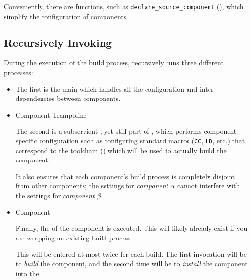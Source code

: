 Conveniently, there are \lmsbw functions, such as
\texttt{declare\_source\_component}
(), which simplify the
configuration of components.

\subsection{Recursively Invoking \make}

During the execution of the build process, \lmsbw recursively runs
three different \makefile processes:

\begin{itemize}
\item \lmsbw \makefile

  The first is the main \lmsbw \makefile which handles all the
  configuration and inter-dependencies between components.

\item Component Trampoline \makefile

  The second is a subservient \makefile, yet still part of \lmsbw,
  which performs component-specific configuration such as configuring
  standard \makefile macros (\texttt{CC}, \texttt{LD}, etc.) that
  correspond to the toolchain () which will
  be used to actually build the component.

  It also ensures that each component's build process is completely
  disjoint from other components; the settings for \emph{component $\alpha$}
  cannot interfere with the settings for \emph{component $\beta$}.

\item Component \makefile

  Finally, the \makefile of the component is executed.  This will
  likely already exist if you are wrapping an existing build process.

  This \makefile will be entered at most twice for each build.  The
  first invocation will be to \emph{build} the component, and the
  second time will be to \emph{install} the component into the
  \destdir.
\end{itemize}
